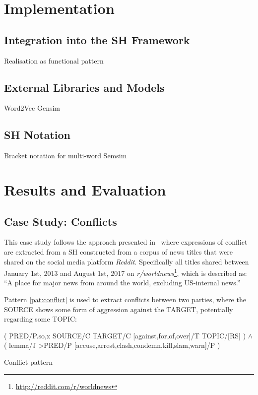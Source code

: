\documentclass[11pt]{scrreprt}
\begin{document}
\chapter{Implementation}

\section{Integration into the SH Framework}
Realisation as functional pattern


\section{External Libraries and Models}
Word2Vec
Gensim






\section{SH Notation}
Bracket notation for multi-word Semsim



\chapter{Results and Evaluation}
\section{Case Study: Conflicts}
This case study follows the approach presented in \cite[p.~22]{menezes_semantic_2021} where expressions of conflict are extracted from a SH constructed from a corpus of news titles that were shared on the social media platform \textit{Reddit}. Specifically all titles shared between January 1st, 2013 and August 1st, 2017 on \textit{r/worldnews}\footnote{\url{http://reddit.com/r/worldnews}}, which is described as: “A place for major news from around the world, excluding US-internal news.”

Pattern \ref{pat:conflict} is used to extract conflicts between two parties, where the \textsf{SOURCE} shows some form of aggression against the \textsf{TARGET}, potentially regarding some \textsf{TOPIC}:

\begin{pattern}
  \normalfont\sffamily
  \centering
  ( PRED/P.{so,x} SOURCE/C TARGET/C [against,for,of,over]/T TOPIC/[RS] ) \(\wedge\)\\ ( lemma/J >PRED/P [accuse,arrest,clash,condemn,kill,slam,warn]/P )
  \caption{Conflict pattern}
  \label{pat:conflict}
\end{pattern}
\end{document}
